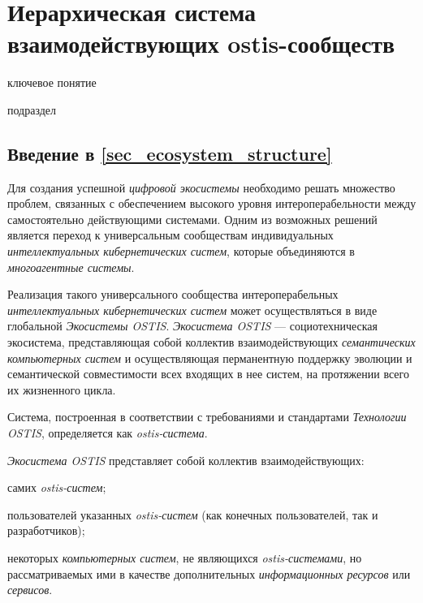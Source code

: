 \section{Иерархическая система взаимодействующих ostis-сообществ}
{\label{sec_ecosystem_structure}} 

\begin{SCn}


\begin{scnrelfromlist}{ключевое понятие}
\end{scnrelfromlist}

\begin{scnrelfromlist}{подраздел}
\end{scnrelfromlist}

\end{SCn}

\subsection*{Введение в \ref{sec_ecosystem_structure}}
Для создания успешной \textit{цифровой экосистемы} необходимо решать множество проблем, связанных с обеспечением высокого уровня интероперабельности между самостоятельно действующими системами. Одним из возможных решений является переход к универсальным сообществам индивидуальных \textit{интеллектуальных кибернетических систем}, которые объединяются в \textit{многоагентные системы}.

Реализация такого универсального сообщества интероперабельных \textit{интеллектуальных кибернетических систем} может осуществляться в виде глобальной \textit{Экосистемы OSTIS}. 
\textit{Экосистема OSTIS} --- социотехническая экосистема, представляющая собой коллектив взаимодействующих \textit{семантических компьютерных систем} и осуществляющая перманентную поддержку эволюции и семантической совместимости всех входящих в нее систем, на протяжении всего их жизненного цикла. 

Система, построенная в соответствии с требованиями и стандартами \textit{Технологии OSTIS}, определяется как \textit{ostis-система}. 

\textit{Экосистема OSTIS} представляет собой коллектив взаимодействующих:
\begin{textitemize}
    \item самих \textit{ostis-систем};
    \item пользователей указанных \textit{ostis-систем} (как конечных пользователей, так и разработчиков);
    \item некоторых \textit{компьютерных систем}, не являющихся \textit{ostis-системами}, но рассматриваемых ими в качестве дополнительных \textit{информационных ресурсов} или \textit{сервисов}.
\end{textitemize}

